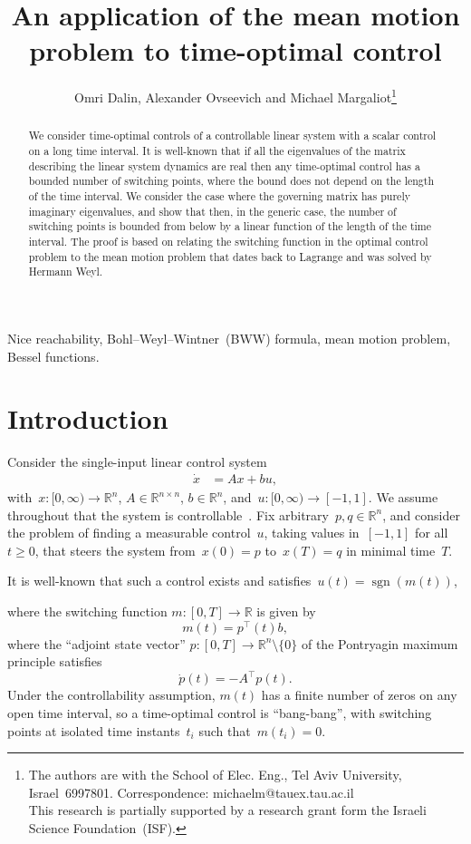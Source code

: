 \documentclass[final ]{IEEEtran}
\title{\LARGE \bf
An application of the  mean motion problem to  
time-optimal control}
\author{Omri Dalin, Alexander Ovseevich and Michael Margaliot\thanks{The authors are with the School of Elec. Eng., Tel Aviv University, Israel~6997801. Correspondence: michaelm@tauex.tau.ac.il \\
This research is partially supported by a research grant form the Israeli Science Foundation~(ISF).} }
\newcommand{\sign}{\operatorname{sgn}}
\newcommand {\R}{\mathbb R}
\begin{document}
\maketitle

\begin{abstract}
We consider  time-optimal controls of a  controllable linear  system   with a scalar control on a  long  time interval. It is well-known that if all the eigenvalues of the matrix describing the linear system dynamics 
are real then any time-optimal control has a bounded number of
switching  points, where the bound
does not depend on the length of the time interval.
We consider  the case where the governing matrix   has purely imaginary  eigenvalues, and show that then, in the generic case, the number of switching points is  bounded from below by a linear function of the length of the time
interval.   The    proof  is based on   relating the    switching function in the optimal control problem to
the   mean motion problem that dates back to Lagrange and was solved  by Hermann Weyl.
\end{abstract}

\begin{IEEEkeywords}
Nice reachability,
Bohl–Weyl–Wintner~(BWW) formula, mean motion problem, Bessel functions.
\end{IEEEkeywords}

\section{Introduction}
Consider the single-input
linear control system
\begin{align}\label{eq:lin_cont_sys}
\dot x&=Ax + b u,
\end{align}
 with~$x:[0,\infty)\to \R^n$, $A\in\R^{n\times n}$, $b\in\R^n$,
 and~$u:[0,\infty)\to[-1,1]$.
We assume throughout that the system is controllable~\cite{sontag_book_control_theory}.   Fix arbitrary~$p,q\in\R^n$, and consider the problem of finding a measurable  control~$u$, taking values in~$[-1,1]$ for all~$t\geq 0$, that steers the system from~$x(0)=p$ to~$x(T)=q$ in minimal time~$T$.

It is well-known that such a control 
exists and satisfies~$u(t)=\sign (m(t))$,

where  the switching function $m:[0,T]\to\R$ is given by
\begin{equation}\label{switching}
 m(t)=p^\top (t)b,
\end{equation}
where the ``adjoint state vector'' $p:[0,T]\to\R^n\setminus\{0\}$   of the Pontryagin maximum principle satisfies
\begin{equation}\label{adjoint}\dot p(t)=- A^\top p(t).
\end{equation}
Under the controllability assumption, $m(t)$ has a finite number of zeros on any open  time interval, so 
  a time-optimal control is  ``bang-bang'',  with switching points at isolated
  time instants~$t_i$ such that~$m(t_i)=0$.
\end{document}

